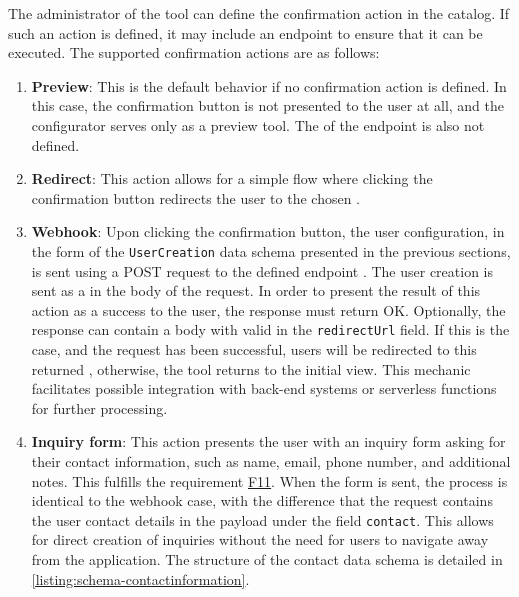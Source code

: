 The administrator of the tool can define the confirmation action in the catalog. If such an action is defined, it may include an endpoint  to ensure that it can be executed. The supported confirmation actions are as follows:

\begin{enumerate}
    \item \textbf{Preview}: This is the default behavior if no confirmation action is defined. In this case, the confirmation button is not presented to the user at all, and the configurator serves only as a preview tool. The  of the endpoint is also not defined.
    \item \textbf{Redirect}: This action allows for a simple flow where clicking the confirmation button redirects the user to the chosen .
    \item \textbf{Webhook}: Upon clicking the confirmation button, the user configuration, in the form of the \texttt{UserCreation} data schema presented in the previous sections, is sent using a POST request to the defined endpoint . The user creation is sent as a  in the body of the request. In order to present the result of this action as a success to the user, the response must return OK. Optionally, the response can contain a  body with valid  in the \texttt{redirectUrl} field. If this is the case, and the request has been successful, users will be redirected to this returned , otherwise, the tool returns to the initial view. This mechanic facilitates possible integration with back-end systems or serverless functions for further processing.
    \item \textbf{Inquiry form}: This action presents the user with an inquiry form asking for their contact information, such as name, email, phone number, and additional notes. This fulfills the requirement \hyperref[itm:F11]{F11}. When the form is sent, the process is identical to the webhook case, with the difference that the request contains the user contact details in the  payload under the field \texttt{contact}. This allows for direct creation of inquiries without the need for users to navigate away from the application. The structure of the contact data schema is detailed in \autoref{listing:schema-contactinformation}.
\end{enumerate}


